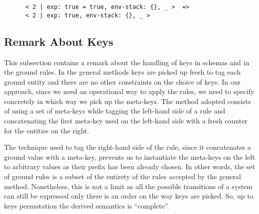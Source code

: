 \documentclass{article}[12pt,a4paper]
\theoremstyle{definition}
\begin{document}
\begin{Verbatim}
      < 2 | exp: true = true, env-stack: {}, _ >  =>
      < 2 | exp: true, env-stack: {}, _ >
\end{Verbatim}

\subsection{Remark About Keys}

This subsection contains a remark about the handling of keys in schemas and in
the ground rules. In the general methods keys are picked up fresh to tag each
ground entity and there are no other constraints on the choice of keys. In our
approach, since we need an operational way to apply the rules, we need to
specify concretely in which way we pick up the meta-keys. The method adopted
consists of using a set of meta-keys while tagging the left-hand side of a rule
and concatenating the first meta-key used on the left-hand side with a fresh
counter for the entities on the right.

The technique used to tag the right-hand side of the rule, since it concatenates
a ground value with a meta-key, prevents us to instantiate the meta-keys on the
left to arbitrary values as their prefix has been already chosen. In other
words, the set of ground rules is a subset of the entirety of the rules accepted
by the general method. Nonetheless, this is not a limit as all the possible
transitions of a system can still be expressed only there is an order on the way
keys are picked. So, up to keys permutation the derived semantics is ``complete''.
\end{document}
